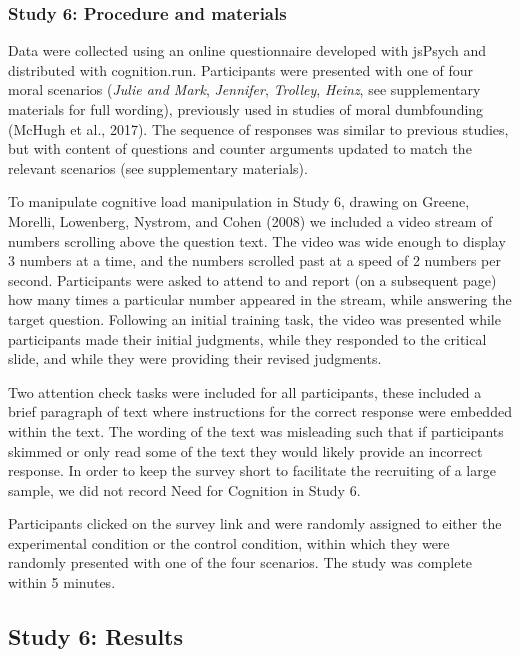 \documentclass[
  american,
  man,floatsintext]{apa7}
\begin{document}
\hypertarget{study-6-procedure-and-materials}{%
\subsubsection{Study 6: Procedure and materials}\label{study-6-procedure-and-materials}}

Data were collected using an online questionnaire developed with jsPsych and distributed with cognition.run. Participants were presented with one of four moral scenarios (\emph{Julie and Mark}, \emph{Jennifer}, \emph{Trolley}, \emph{Heinz}, see supplementary materials for full wording), previously used in studies of moral dumbfounding (McHugh et al., 2017). The sequence of responses was similar to previous studies, but with content of questions and counter arguments updated to match the relevant scenarios (see supplementary materials).

To manipulate cognitive load manipulation in Study 6, drawing on Greene, Morelli, Lowenberg, Nystrom, and Cohen (2008) we included a video stream of numbers scrolling above the question text. The video was wide enough to display 3 numbers at a time, and the numbers scrolled past at a speed of 2 numbers per second. Participants were asked to attend to and report (on a subsequent page) how many times a particular number appeared in the stream, while answering the target question. Following an initial training task, the video was presented while participants made their initial judgments, while they responded to the critical slide, and while they were providing their revised judgments.

Two attention check tasks were included for all participants, these included a brief paragraph of text where instructions for the correct response were embedded within the text. The wording of the text was misleading such that if participants skimmed or only read some of the text they would likely provide an incorrect response. In order to keep the survey short to facilitate the recruiting of a large sample, we did not record Need for Cognition in Study 6.

Participants clicked on the survey link and were randomly assigned to either the experimental condition or the control condition, within which they were randomly presented with one of the four scenarios. The study was complete within 5 minutes.

\hypertarget{study-6-results}{%
\subsection{Study 6: Results}\label{study-6-results}}
\end{document}
